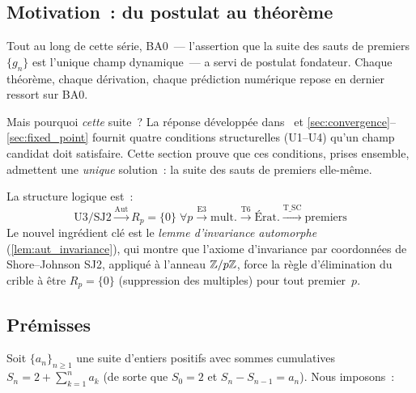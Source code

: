 \documentclass[12pt,a4paper]{article}
\begin{document}
\subsection{Motivation~: du postulat au théorème}
\label{sec:ch25_motivation}

Tout au long de cette série, BA0~--- l'assertion que la suite des
sauts de premiers $\{g_n\}$ est l'unique champ dynamique~--- a servi
de postulat fondateur. Chaque théorème, chaque dérivation, chaque
prédiction numérique repose en dernier ressort sur BA0.

Mais pourquoi \emph{cette} suite~? La réponse développée
dans~\cite{companion_M1} et
\cref{sec:convergence}--\cref{sec:fixed_point} fournit quatre
conditions structurelles (U1--U4) qu'un champ candidat doit
satisfaire. Cette section prouve que ces conditions, prises ensemble,
admettent une \emph{unique} solution~: la suite des sauts de premiers
elle-même.

La structure logique est~:
\begin{equation}
  \text{U3/SJ2} \xrightarrow{\text{Aut}} R_p = \{0\}\;\forall p
  \xrightarrow{\text{E3}} \text{mult.}
  \xrightarrow{\text{T6}} \text{Érat.}
  \xrightarrow{\text{T\_SC}} \text{premiers}
  \label{eq:T0_chain}
\end{equation}
Le nouvel ingrédient clé est le \emph{lemme d'invariance automorphe}
(\cref{lem:aut_invariance}), qui montre que l'axiome
d'invariance par coordonnées de Shore--Johnson SJ2, appliqué à
l'anneau $\mathbb{Z}/p\mathbb{Z}$, force la règle d'élimination du crible à être
$R_p = \{0\}$ (suppression des multiples) pour tout premier~$p$.

\subsection{Prémisses}
\label{sec:ch25_premises}

Soit $\{a_n\}_{n \geq 1}$ une suite d'entiers positifs avec sommes
cumulatives $S_n = 2 + \sum_{k=1}^{n} a_k$ (de sorte que $S_0 = 2$
et $S_n - S_{n-1} = a_n$). Nous imposons~:
\end{document}
